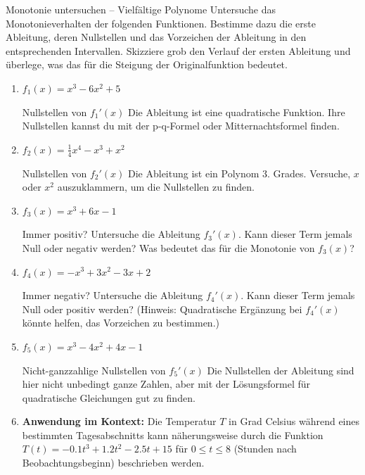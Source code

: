 \begin{aufgabenumgebung}{Monotonie untersuchen – Vielfältige Polynome}
Untersuche das Monotonieverhalten der folgenden Funktionen. Bestimme dazu die erste Ableitung, deren Nullstellen und das Vorzeichen der Ableitung in den entsprechenden Intervallen. Skizziere grob den Verlauf der ersten Ableitung und überlege, was das für die Steigung der Originalfunktion bedeutet.
\begin{enumerate}
    \item $f_1(x) = x^3 - 6x^2 + 5$ 
        \begin{tippumgebung}{Nullstellen von $f_1'(x)$}
        Die Ableitung ist eine quadratische Funktion. Ihre Nullstellen kannst du mit der p-q-Formel oder Mitternachtsformel finden.
        \end{tippumgebung}
    \item $f_2(x) = \frac{1}{4}x^4 - x^3 + x^2$
        \begin{tippumgebung}{Nullstellen von $f_2'(x)$}
        Die Ableitung ist ein Polynom 3. Grades. Versuche, $x$ oder $x^2$ auszuklammern, um die Nullstellen zu finden.
        \end{tippumgebung}
    \item $f_3(x) = x^3 + 6x - 1$
        \begin{tippumgebung}{Immer positiv?}
        Untersuche die Ableitung $f_3'(x)$. Kann dieser Term jemals Null oder negativ werden? Was bedeutet das für die Monotonie von $f_3(x)$?
        \end{tippumgebung}
    \item $f_4(x) = -x^3 + 3x^2 - 3x + 2$
        \begin{tippumgebung}{Immer negativ?}
        Untersuche die Ableitung $f_4'(x)$. Kann dieser Term jemals Null oder positiv werden? (Hinweis: Quadratische Ergänzung bei $f_4'(x)$ könnte helfen, das Vorzeichen zu bestimmen.)
        \end{tippumgebung}
    \item $f_5(x) = x^3 - 4x^2 + 4x - 1$
        \begin{tippumgebung}{Nicht-ganzzahlige Nullstellen von $f_5'(x)$}
        Die Nullstellen der Ableitung sind hier nicht unbedingt ganze Zahlen, aber mit der Lösungsformel für quadratische Gleichungen gut zu finden.
        \end{tippumgebung}
    \item \textbf{Anwendung im Kontext:} Die Temperatur $T$ in Grad Celsius während eines bestimmten Tagesabschnitts kann näherungsweise durch die Funktion $T(t) = -0.1t^3 + 1.2t^2 - 2.5t + 15$ für $0 \le t \le 8$ (Stunden nach Beobachtungsbeginn) beschrieben werden. 

\end{enumerate}
\end{aufgabenumgebung}
